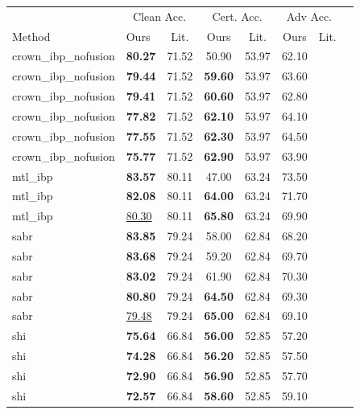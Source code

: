 \begin{tabular}{llcccccc}
\toprule
 & \multicolumn{2}{c}{Clean Acc.} & \multicolumn{2}{c}{Cert. Acc.} & \multicolumn{2}{c}{Adv Acc.} \\
Method & Ours & Lit. & Ours & Lit. & Ours & Lit. \\
\midrule
crown\_ibp\_nofusion & \textbf{80.27} & 71.52 & 50.90 & 53.97 & 62.10 & \\
crown\_ibp\_nofusion & \textbf{79.44} & 71.52 & \textbf{59.60} & 53.97 & 63.60 & \\
crown\_ibp\_nofusion & \textbf{79.41} & 71.52 & \textbf{60.60} & 53.97 & 62.80 & \\
crown\_ibp\_nofusion & \textbf{77.82} & 71.52 & \textbf{62.10} & 53.97 & 64.10 & \\
crown\_ibp\_nofusion & \textbf{77.55} & 71.52 & \textbf{62.30} & 53.97 & 64.50 & \\
crown\_ibp\_nofusion & \textbf{75.77} & 71.52 & \textbf{62.90} & 53.97 & 63.90 & \\
mtl\_ibp & \textbf{83.57} & 80.11 & 47.00 & 63.24 & 73.50 & \\
mtl\_ibp & \textbf{82.08} & 80.11 & \textbf{64.00} & 63.24 & 71.70 & \\
mtl\_ibp & \underline{80.30} & 80.11 & \textbf{65.80} & 63.24 & 69.90 & \\
sabr & \textbf{83.85} & 79.24 & 58.00 & 62.84 & 68.20 & \\
sabr & \textbf{83.68} & 79.24 & 59.20 & 62.84 & 69.70 & \\
sabr & \textbf{83.02} & 79.24 & 61.90 & 62.84 & 70.30 & \\
sabr & \textbf{80.80} & 79.24 & \textbf{64.50} & 62.84 & 69.30 & \\
sabr & \underline{79.48} & 79.24 & \textbf{65.00} & 62.84 & 69.10 & \\
shi & \textbf{75.64} & 66.84 & \textbf{56.00} & 52.85 & 57.20 & \\
shi & \textbf{74.28} & 66.84 & \textbf{56.20} & 52.85 & 57.50 & \\
shi & \textbf{72.90} & 66.84 & \textbf{56.90} & 52.85 & 57.70 & \\
shi & \textbf{72.57} & 66.84 & \textbf{58.60} & 52.85 & 59.10 & \\
\bottomrule
\end{tabular}